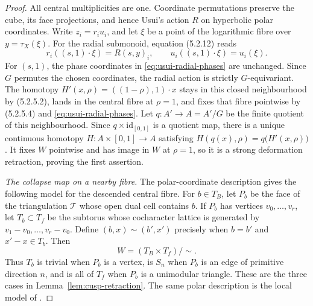 \documentclass[11pt]{article}
\theoremstyle{definition}
\theoremstyle{remark}
\numberwithin{equation}{section}
\begin{document}
\begin{proof}
All central multiplicities are one.  Coordinate permutations preserve the
cube, its face projections, and hence Usui's action $R$ on hyperbolic
polar coordinates.  Write $z_i=r_iu_i$, and let $\xi$ be a point of the
logarithmic fibre over $y=\tau_X(\xi)$.  For the radial submonoid,
equation (5.2.12) reads
\begin{equation}\label{eq:usui-radial-phases}
 r_i((s,1)\cdot\xi)=R(s,y)_i,
 \qquad u_i((s,1)\cdot\xi)=u_i(\xi).
\end{equation}
For $(s,1)$, the phase coordinates in
\eqref{eq:usui-radial-phases} are unchanged.  Since $G$ permutes the chosen
coordinates, the radial action is strictly $G$-equivariant.  The homotopy
$H'(x,\rho)=((1-\rho),1)\cdot x$ stays in this closed neighbourhood by (5.2.5.2),
lands in the central fibre at $\rho=1$, and fixes that fibre pointwise by
(5.2.5.4) and \eqref{eq:usui-radial-phases}.  Let $q:A'\to A=A'/G$ be the
finite quotient of this neighbourhood.  Since $q\times\mathrm{id}_{[0,1]}$ is
a quotient map, there is a unique continuous homotopy
$H:A\times[0,1]\to A$ satisfying
$H(q(x),\rho)=q\bigl(H'(x,\rho)\bigr)$.
It fixes $W$ pointwise and has image in $W$ at $\rho=1$, so it is a
strong deformation retraction, proving the first assertion.

\smallskip
\noindent\emph{The collapse map on a nearby fibre.}
The polar-coordinate description gives the following model for the descended
central fibre.  For $b\in T_B$, let $P_b$ be the face of the
triangulation $\mathcal T$ whose open dual cell contains $b$.  If
$P_b$ has vertices $v_0,\ldots,v_r$, let $T_b\subset T_f$ be the
subtorus whose cocharacter lattice is generated by
$v_1-v_0,\ldots,v_r-v_0$.  Define
$(b,x)\sim(b',x')$ precisely when $b=b'$ and $x'-x\in T_b$.  Then
\begin{equation}\label{eq:cusp-collapse-quotient}
 W=(T_B\times T_f)/{\sim}.
\end{equation}
Thus $T_b$ is trivial when $P_b$ is a vertex, is $S_n$ when $P_b$
is an edge of primitive direction $n$, and is all of $T_f$ when
$P_b$ is a unimodular triangle.  These are the three cases in
Lemma~\ref{lem:cusp-retraction}.  The same polar description is the local
model of \citep[Proposition~3.1 and Theorems~3.7, 5.1]{NakayamaOgus2010}.


\end{proof}
\end{document}
